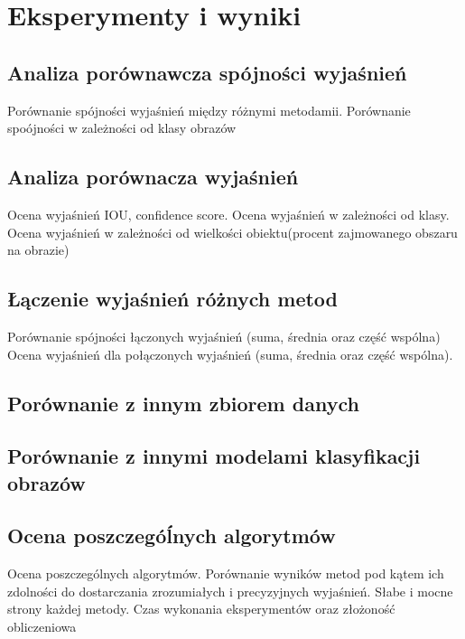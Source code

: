 
\chapter*{Eksperymenty i wyniki}

\section*{Analiza porównawcza spójności wyjaśnień}
Porównanie spójności wyjaśnień między różnymi metodamii.
Porównanie spoójności w zależności od klasy obrazów

\section*{Analiza porównacza wyjaśnień}
Ocena wyjaśnień IOU, confidence score.
Ocena wyjaśnień w zależności od klasy.
Ocena wyjaśnień w zależności od wielkości obiektu(procent zajmowanego obszaru na obrazie)

\section*{Łączenie wyjaśnień różnych metod}
Porównanie spójności łączonych wyjaśnień (suma, średnia oraz część wspólna)
Ocena wyjaśnień dla połączonych wyjaśnień (suma, średnia oraz część wspólna).

\section*{Porównanie z innym zbiorem danych}

\section*{Porównanie z innymi modelami klasyfikacji obrazów}

\section*{Ocena poszczegóĺnych algorytmów}
Ocena poszczególnych algorytmów.
Porównanie wyników metod pod kątem ich zdolności do dostarczania zrozumiałych i precyzyjnych wyjaśnień.
Słabe i mocne strony każdej metody.
Czas wykonania eksperymentów oraz złożoność obliczeniowa

